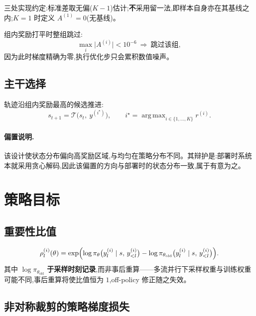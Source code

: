 \documentclass[UTF8, 11pt]{ctexart}
\DeclareMathOperator*{\argmax}{arg\,max}
\begin{document}
三处实现约定:标准差取无偏($K-1$)估计;\textbf{不}采用留一法,即样本自身亦在其基线之内;$K=1$ 时定义 $A^{(1)}=0$(无基线)。

组内奖励打平时整组跳过:
\begin{equation}
\max_{i}\bigl\lvert A^{(i)}\bigr\rvert<10^{-6}
\ \Longrightarrow\ \text{跳过该组},
\label{eq:skip}
\end{equation}
因为此时梯度精确为零,执行优化步只会累积数值噪声。

\subsection{主干选择}

轨迹沿组内奖励最高的候选推进:
\begin{equation}
s_{t+1}=\mathcal{T}\bigl(s_t,\ y^{(i^\star)}\bigr),
\qquad
i^\star=\argmax_{i\in\{1,\dots,K\}} r^{(i)} .
\label{eq:trunk}
\end{equation}

\paragraph{偏置说明.} 该设计使状态分布偏向高奖励区域,与均匀在策略分布不同。其辩护是:部署时系统本就采用贪心解码,因此该偏置的方向与部署时的状态分布一致,属于有意为之。

\section{策略目标}

\subsection{重要性比值}

\begin{equation}
\rho^{(i)}_{l}(\theta)
=\exp\Bigl(
\log\pi_{\theta}\bigl(y^{(i)}_{l}\mid s,\,y^{(i)}_{<l}\bigr)
-\log\pi_{\theta_{\text{old}}}\bigl(y^{(i)}_{l}\mid s,\,y^{(i)}_{<l}\bigr)
\Bigr).
\label{eq:ratio}
\end{equation}
其中 $\log\pi_{\theta_{\text{old}}}$ \textbf{于采样时刻记录},而非事后重算——多流并行下采样权重与训练权重可能不同,事后重算将使比值恒为 $1$,off-policy 修正随之失效。

\subsection{非对称裁剪的策略梯度损失}
\end{document}
